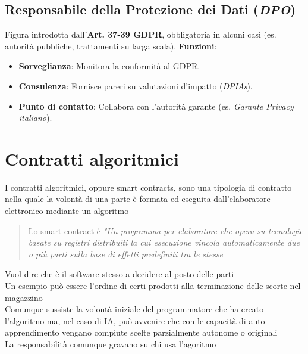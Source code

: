 \documentclass[8pt,oneside,a4paper]{article}
\begin{document}
	\subsection{Responsabile della Protezione dei Dati (\textit{DPO})}
	Figura introdotta dall'\textbf{Art. 37-39 GDPR}, obbligatoria in alcuni casi (es. autorità pubbliche, trattamenti su larga scala).  
	\noindent \textbf{Funzioni}:
	\begin{itemize}
		\item \textbf{Sorveglianza}: Monitora la conformità al GDPR.
		\item \textbf{Consulenza}: Fornisce pareri su valutazioni d'impatto (\textit{DPIAs}).
		\item \textbf{Punto di contatto}: Collabora con l'autorità garante (es. \textit{Garante Privacy italiano}).
	\end{itemize}
	\section{Contratti algoritmici}
	I contratti algoritmici, oppure smart contracts, sono una tipologia di contratto nella quale la volontà di una parte è formata ed eseguita dall'elaboratore elettronico mediante un algoritmo\\
	\begin{quote}
		Lo smart contract è \textit{"Un programma per elaboratore che opera su tecnologie basate su registri distribuiti la cui esecuzione vincola automaticamente due o più parti sulla base di effetti predefiniti tra le stesse}
	\end{quote}
	Vuol dire che è il software stesso a decidere al posto delle parti\\
	Un esempio può essere l'ordine di certi prodotti alla terminazione delle scorte nel magazzino\\
	Comunque sussiste la volontà iniziale del programmatore che ha creato l'algoritmo ma, nel caso di IA, può avvenire che con le capacità di auto apprendimento vengano compiute scelte parzialmente autonome o originali\\
	La responsabilità comunque gravano su chi usa l'agoritmo
\end{document}
